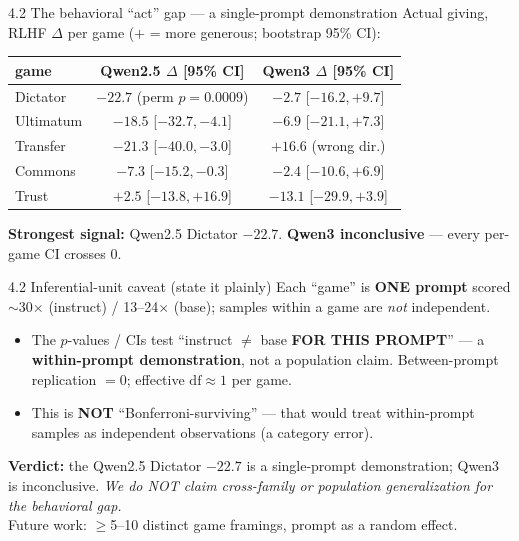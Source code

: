 \documentclass[aspectratio=169,11pt]{beamer}
\begin{document}
\begin{frame}{4.2 The behavioral ``act'' gap --- a single-prompt demonstration}
Actual giving, RLHF $\Delta$ per game ($+$ = more generous; bootstrap 95\% CI):
\begin{center}
\footnotesize
\begin{tabular}{lcc}
\toprule
game & Qwen2.5 $\Delta$ [95\% CI] & Qwen3 $\Delta$ [95\% CI] \\
\midrule
Dictator  & $\mathbf{-22.7}$ (perm $p=0.0009$) & $-2.7$ [$-16.2,+9.7$] \\
Ultimatum & $-18.5$ [$-32.7,-4.1$]            & $-6.9$ [$-21.1,+7.3$] \\
Transfer  & $-21.3$ [$-40.0,-3.0$]            & $\mathbf{+16.6}$ (wrong dir.) \\
Commons   & $-7.3$  [$-15.2,-0.3$]            & $-2.4$ [$-10.6,+6.9$] \\
Trust     & $+2.5$  [$-13.8,+16.9$]           & $-13.1$ [$-29.9,+3.9$] \\
\bottomrule
\end{tabular}
\end{center}
\textbf{Strongest signal:} Qwen2.5 Dictator $-22.7$. \textbf{Qwen3 inconclusive} --- every per-game CI crosses 0.
\end{frame}

\begin{frame}{4.2 Inferential-unit caveat (state it plainly)}
Each ``game'' is \textbf{ONE prompt} scored $\sim$30$\times$ (instruct) / 13--24$\times$ (base); samples within a game are \emph{not} independent.
\begin{itemize}
  \item The $p$-values / CIs test ``instruct $\neq$ base \textbf{FOR THIS PROMPT}'' --- a \textbf{within-prompt demonstration}, not a population claim. Between-prompt replication $= 0$; effective $\mathrm{df}\approx 1$ per game.
  \item This is \textbf{NOT} ``Bonferroni-surviving'' --- that would treat within-prompt samples as independent observations (a category error).
\end{itemize}
\textbf{Verdict:} the Qwen2.5 Dictator $-22.7$ is a single-prompt demonstration; Qwen3 is inconclusive. \emph{We do NOT claim cross-family or population generalization for the behavioral gap.}\\[2pt]
\footnotesize Future work: $\geq$5--10 distinct game framings, prompt as a random effect.
\end{frame}
\end{document}

